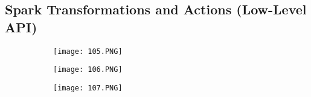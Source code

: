 \documentclass{article}
\begin{document}
\vspace{100mm}

\subsection{Spark Transformations and Actions (Low-Level API)}

\begin{figure}[ht!]
  \centering
  \begin{subfigure}[b]{0.5\linewidth}
    \texttt{[image: 105.PNG]}
  \end{subfigure}
     \begin{subfigure}[b]{0.4\textwidth}
         \centering
         \texttt{[image: 106.PNG]}
     \end{subfigure}
\end{figure}

\begin{figure}[ht!]
  \centering
  \begin{subfigure}[b]{0.5\linewidth}
    \texttt{[image: 107.PNG]}
  \end{subfigure}
\end{figure}
\end{document}
